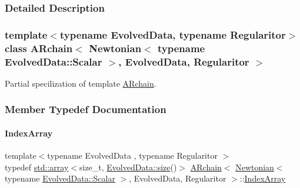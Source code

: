 \subsubsection{Detailed Description}
\subsubsection*{template$<$typename Evolved\+Data, typename Regularitor$>$\newline
class A\+Rchain$<$ Newtonian$<$ typename Evolved\+Data\+::\+Scalar $>$, Evolved\+Data, Regularitor $>$}

Partial specilization of template \mbox{\hyperlink{class_a_rchain}{A\+Rchain}}. 

\subsubsection{Member Typedef Documentation}
\mbox{\label{class_a_rchain_3_01_newtonian_3_01typename_01_evolved_data_1_1_scalar_01_4_00_01_evolved_data_00_01_regularitor_01_4_a0072f8585c3e6ba8d64cb81be90fb376}} 
\paragraph{\texorpdfstring{Index\+Array}{IndexArray}}
{\footnotesize\ttfamily template$<$typename Evolved\+Data , typename Regularitor $>$ \\
typedef \mbox{\hyperlink{class_a_rchain_aeb4d9b0a28ae3b4e4286edf838e5a905}{std\+::array}}$<$size\+\_\+t, \mbox{\hyperlink{class_a_rchain_ac612af46ce057d56dc47a6d28738a4cf}{Evolved\+Data\+::size}}()$>$ \mbox{\hyperlink{class_a_rchain}{A\+Rchain}}$<$ \mbox{\hyperlink{class_newtonian}{Newtonian}}$<$ typename \mbox{\hyperlink{class_a_rchain_a707e42a79e4744424a34c9007e84ee07}{Evolved\+Data\+::\+Scalar}} $>$, Evolved\+Data, Regularitor $>$\+::\mbox{\hyperlink{class_a_rchain_3_01_newtonian_3_01typename_01_evolved_data_1_1_scalar_01_4_00_01_evolved_data_00_01_regularitor_01_4_a0072f8585c3e6ba8d64cb81be90fb376}{Index\+Array}}}

